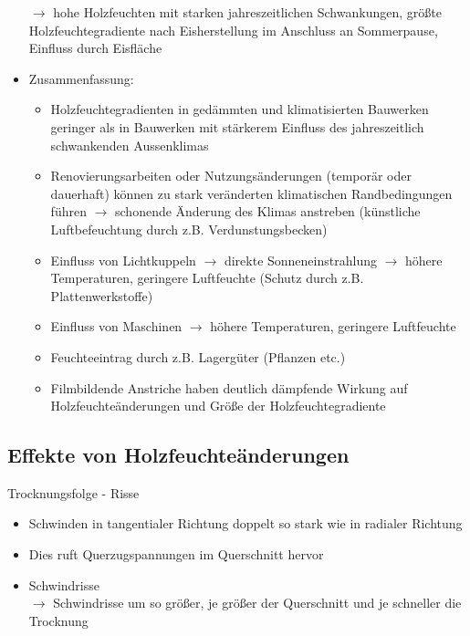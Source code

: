 \documentclass[fleqn,twoside]{article}
\begin{document}
\begin{itemize}
                        $\rightarrow$ hohe Holzfeuchten mit starken jahreszeitlichen Schwankungen, größte Holzfeuchtegradiente nach Eisherstellung im Anschluss an Sommerpause, Einfluss durch Eisfläche
                    \item Zusammenfassung:
                        \begin{itemize}
                            \item Holzfeuchtegradienten in gedämmten und klimatisierten Bauwerken geringer als in Bauwerken mit stärkerem Einfluss des jahreszeitlich schwankenden Aussenklimas
                            \item Renovierungsarbeiten oder Nutzungsänderungen (temporär oder dauerhaft) können zu stark veränderten klimatischen Randbedingungen führen $\rightarrow$ schonende Änderung des Klimas anstreben (künstliche Luftbefeuchtung durch z.B. Verdunstungsbecken)
                            \item Einfluss von Lichtkuppeln $\rightarrow$ direkte Sonneneinstrahlung $\rightarrow$ höhere Temperaturen, geringere Luftfeuchte (Schutz durch z.B. Plattenwerkstoffe) 
                            \item Einfluss von Maschinen $\rightarrow$ höhere Temperaturen, geringere Luftfeuchte 
                            \item Feuchteeintrag durch z.B. Lagergüter (Pflanzen etc.) \item Filmbildende Anstriche haben deutlich dämpfende Wirkung auf Holzfeuchteänderungen und Größe der Holzfeuchtegradiente
                        \end{itemize}
                \end{itemize}

    \subsection{Effekte von Holzfeuchteänderungen}
        Trocknungsfolge - Risse
            \begin{itemize}
                \item Schwinden in tangentialer Richtung doppelt so stark wie in radialer Richtung
                \item Dies ruft Querzugspannungen im Querschnitt hervor
                \item Schwindrisse\\
                    $\rightarrow$ Schwindrisse um so größer, je größer der Querschnitt und je schneller die Trocknung
        \end{itemize}
        
\end{document}
